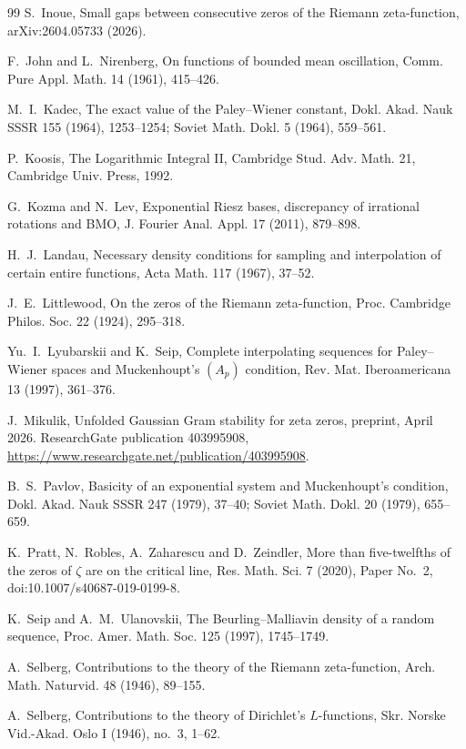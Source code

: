 \documentclass[11pt]{article}
\begin{document}
\begin{thebibliography}{99}
 S.~Inoue, Small gaps between consecutive zeros of the Riemann zeta-function, arXiv:2604.05733 (2026).

 F.~John and L.~Nirenberg, On functions of bounded mean oscillation, Comm. Pure Appl. Math. 14 (1961), 415--426.

 M.~I.~Kadec, The exact value of the Paley--Wiener constant, Dokl. Akad. Nauk SSSR 155 (1964), 1253--1254; Soviet Math. Dokl. 5 (1964), 559--561.

 P.~Koosis, The Logarithmic Integral II, Cambridge Stud. Adv. Math. 21, Cambridge Univ. Press, 1992.

 G.~Kozma and N.~Lev, Exponential Riesz bases, discrepancy of irrational rotations and BMO, J. Fourier Anal. Appl. 17 (2011), 879--898.

 H.~J.~Landau, Necessary density conditions for sampling and interpolation of certain entire functions, Acta Math. 117 (1967), 37--52.

 J.~E.~Littlewood, On the zeros of the Riemann zeta-function, Proc. Cambridge Philos. Soc. 22 (1924), 295--318.

 Yu.~I.~Lyubarskii and K.~Seip, Complete interpolating sequences for Paley--Wiener spaces and Muckenhoupt's $(A_p)$ condition, Rev. Mat. Iberoamericana 13 (1997), 361--376.

 J.~Mikulik, Unfolded Gaussian Gram stability for zeta zeros, preprint, April 2026. ResearchGate publication 403995908, \url{https://www.researchgate.net/publication/403995908}.

 B.~S.~Pavlov, Basicity of an exponential system and Muckenhoupt's condition, Dokl. Akad. Nauk SSSR 247 (1979), 37--40; Soviet Math. Dokl. 20 (1979), 655--659.

 K.~Pratt, N.~Robles, A.~Zaharescu and D.~Zeindler, More than five-twelfths of the zeros of $\zeta$ are on the critical line, Res. Math. Sci. 7 (2020), Paper No.~2, doi:10.1007/s40687-019-0199-8.

 K.~Seip and A.~M.~Ulanovskii, The Beurling--Malliavin density of a random sequence, Proc. Amer. Math. Soc. 125 (1997), 1745--1749.

 A.~Selberg, Contributions to the theory of the Riemann zeta-function, Arch. Math. Naturvid. 48 (1946), 89--155.

 A.~Selberg, Contributions to the theory of Dirichlet's $L$-functions, Skr. Norske Vid.-Akad. Oslo I (1946), no.~3, 1--62.


\end{thebibliography}
\end{document}
